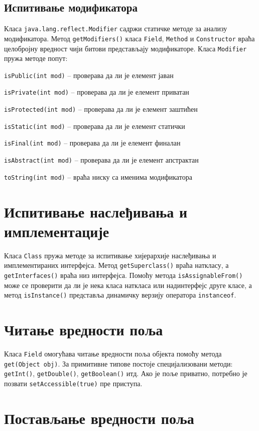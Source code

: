 \subsection{Испитивање модификатора}

Класа \texttt{java.lang.reflect.Modifier} садржи статичке методе за анализу модификатора. Метод \texttt{getModifiers()} класа \texttt{Field}, \texttt{Method} и \texttt{Constructor} враћа целобројну вредност чији битови представљају модификаторе. Класа \texttt{Modifier} пружа методе попут:

\texttt{isPublic(int mod)} – проверава да ли је елемент јаван

\texttt{isPrivate(int mod)} – проверава да ли је елемент приватан

\texttt{isProtected(int mod)} – проверава да ли је елемент заштићен

\texttt{isStatic(int mod)} – проверава да ли је елемент статички

\texttt{isFinal(int mod)} – проверава да ли је елемент финалан

\texttt{isAbstract(int mod)} – проверава да ли је елемент апстрактан

\texttt{toString(int mod)} – враћа ниску са именима модификатора

\section{Испитивање наслеђивања и имплементације}

Класа \texttt{Class} пружа методе за испитивање хијерархије наслеђивања и имплементираних интерфејса. Метод \texttt{getSuperclass()} враћа наткласу, а \texttt{getInterfaces()} враћа низ интерфејса. Помоћу метода \texttt{isAssignableFrom()} може се проверити да ли је нека класа наткласа или надинтерфејс друге класе, а метод \texttt{isInstance()} представља динамичку верзију оператора \texttt{instanceof}.

\section{Читање вредности поља}

Класа \texttt{Field} омогућава читање вредности поља објекта помоћу метода \texttt{get(Object obj)}. За примитивне типове постоје специјализовани методи: \texttt{getInt()}, \texttt{getDouble()}, \texttt{getBoolean()} итд. Ако је поље приватно, потребно је позвати \texttt{setAccessible(true)} пре приступа.

\section{Постављање вредности поља}

